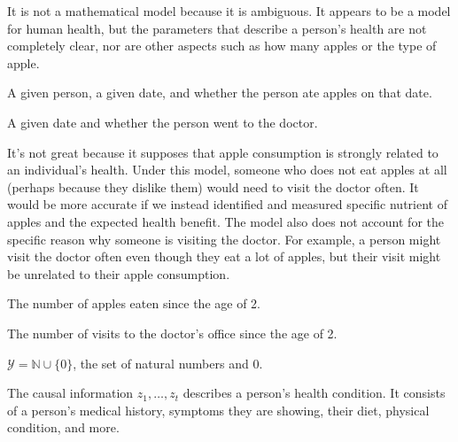\documentclass[12pt]{article}
\begin{document}
\begin{enumerate}



It is not a mathematical model because it is ambiguous. It appears to be a model for human health,
but the parameters that describe a person's health are not completely clear, nor are other aspects such as how many apples or the type of apple.


A given person, a given date, and whether the person ate apples on that date.


A given date and whether the person went to the doctor.


It's not great because it supposes that apple consumption is strongly related to an
individual's health. Under this model, someone who does not eat apples at all
(perhaps because they dislike them) would need to visit the doctor often. It would
be more accurate if we instead identified and measured specific nutrient of apples and
the expected health benefit. The model also does not account for the specific reason why
someone is visiting the doctor. For example, a person might visit the doctor often
even though they eat a lot of apples, but their visit might be unrelated to their apple
consumption.


The number of apples eaten since the age of 2.


The number of visits to the doctor's office since the age of 2.


$\mathcal{Y}=\mathbb{N}\cup \{0\}$, the set of natural numbers and $0$.


The causal information $z_1,\ldots,z_t$ describes a person's health condition. It
consists of a person's medical history, symptoms they are showing, their diet, physical condition,
and more.


\end{enumerate}
\end{document}
